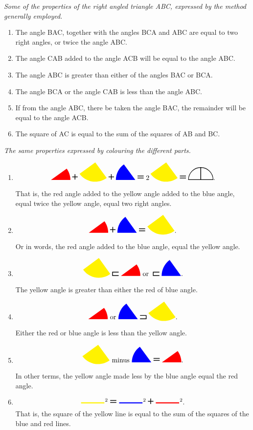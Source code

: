     \begin{center}
        \textit{Some of the properties of the right angled triangle 
        \textrm{ABC}, expressed by the method generally employed.}
    \end{center}

    \begin{enumerate}
        \item The angle BAC, together with the angles BCA and ABC are 
            equal to two right angles, or twice the angle ABC. 
        \item The angle CAB added to the angle ACB will be equal to 
            the angle ABC. 
        \item The angle ABC is greater than either of the 
            angles BAC or BCA. 
        \item The angle BCA or the angle CAB is less than the 
            angle ABC. 
        \item If from the angle ABC, there be taken the angle BAC, 
            the remainder will be equal to the angle ACB. 
        \item The square of AC is equal to the sum of the squares 
            of AB and BC. 
    \end{enumerate}

    \begin{center}
        \textit{The same properties expressed by colouring 
        the different parts.}
    \end{center}

    \begin{enumerate}
        \item \[ \cab \plus \abc \plus \bca \equals 2\, \abc \equals \rightangles.\]
          That is, the red angle added to the yellow angle added to the blue angle, equal twice the yellow angle, equal two right angles. 
      \item \[\cab \plus \bca \equals \abc.\] 
          Or in words, the red angle added to the blue angle, equal the yellow angle. 
      \item \[\abc \greater \cab \text{ or } \greater \bca.\]
          The yellow angle is greater than either the red of blue angle. 
      \item \[\cab \text{ or } \bca \less\abc.\]
          Either the red or blue angle is less than the yellow angle.
      \item \[\abc \text{ minus } \bca \equals \cab.\]
          In other terms, the yellow angle made less by the blue angle equal the red angle. 
      \item \[\tikzhline[yellow]{1.2cm}^{2} \equals \tikzhline[blue]{1.2cm}^{2} \plus \tikzhline[red]{1.2cm}^{2}.\]
          That is, the square of the yellow line is equal to the sum of the squares of the blue and red lines. 
    \end{enumerate}

